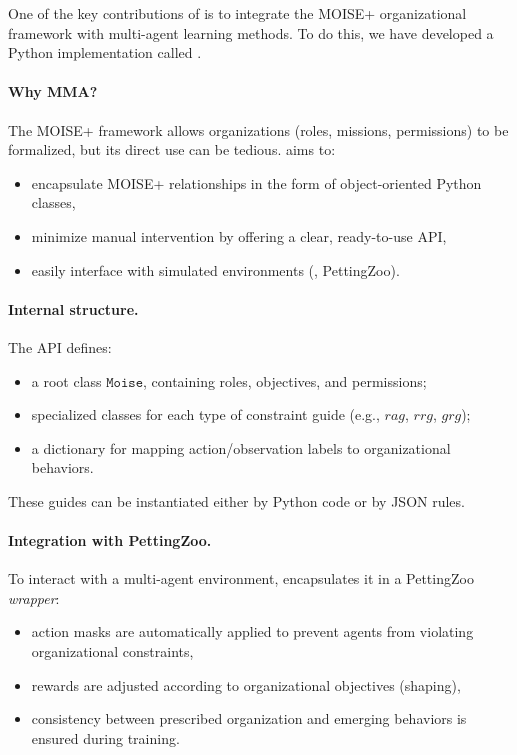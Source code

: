One of the key contributions of \footnotemark[1] is to integrate the MOISE+ organizational framework with multi-agent learning methods. To do this, we have developed a Python implementation called \footnotemark[2].



\paragraph{Why MMA?}
The MOISE+ framework allows organizations (roles, missions, permissions) to be formalized, but its direct use can be tedious.  aims to:
\begin{itemize}
  \item encapsulate MOISE+ relationships in the form of object-oriented Python classes,
  \item minimize manual intervention by offering a clear, ready-to-use API,
  \item easily interface with simulated environments (, PettingZoo).
\end{itemize}

\paragraph{Internal structure.}
The  API defines:
\begin{itemize}
  \item a root class $\texttt{Moise}$, containing roles, objectives, and permissions;
  \item specialized classes for each type of constraint guide (e.g., $rag$, $rrg$, $grg$);
  \item a dictionary for mapping action/observation labels to organizational behaviors.
\end{itemize}
These guides can be instantiated either by Python code or by JSON rules.

\paragraph{Integration with PettingZoo.}
To interact with a multi-agent environment,  encapsulates it in a PettingZoo \textit{wrapper}:
\begin{itemize}
\item action masks are automatically applied to prevent agents from violating organizational constraints,
\item rewards are adjusted according to organizational objectives (shaping),
\item consistency between prescribed organization and emerging behaviors is ensured during training.
\end {itemize}


